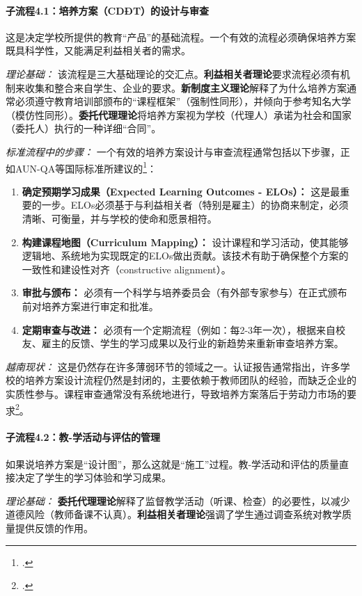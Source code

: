 \paragraph{子流程4.1：培养方案（CDĐT）的设计与审查}
这是决定学校所提供的教育“产品”的基础流程。一个有效的流程必须确保培养方案既具科学性，又能满足利益相关者的需求。

\textit{理论基础：} 该流程是三大基础理论的交汇点。\textbf{利益相关者理论}要求流程必须有机制来收集和整合来自学生、企业的要求。\textbf{新制度主义理论}解释了为什么培养方案通常必须遵守教育培训部颁布的“课程框架”（强制性同形），并倾向于参考知名大学（模仿性同形）。\textbf{委托代理理论}将培养方案视为学校（代理人）承诺为社会和国家（委托人）执行的一种详细“合同”。

\textit{标准流程中的步骤：} 一个有效的培养方案设计与审查流程通常包括以下步骤，正如AUN-QA等国际标准所建议的\footcite{AUN-QAGuide}：
\begin{enumerate}
    \item \textbf{确定预期学习成果（Expected Learning Outcomes - ELOs）：} 这是最重要的一步。ELOs必须基于与利益相关者（特别是雇主）的协商来制定，必须清晰、可衡量，并与学校的使命和愿景相符。
    \item \textbf{构建课程地图（Curriculum Mapping）：} 设计课程和学习活动，使其能够逻辑地、系统地为实现既定的ELOs做出贡献。该技术有助于确保整个方案的一致性和建设性对齐（constructive alignment）。
    \item \textbf{审批与颁布：} 必须有一个科学与培养委员会（有外部专家参与）在正式颁布前对培养方案进行审定和批准。
    \item \textbf{定期审查与改进：} 必须有一个定期流程（例如：每2-3年一次），根据来自校友、雇主的反馈、学生的学习成果以及行业的新趋势来重新审查培养方案。
\end{enumerate}

\textit{越南现状：} 这是仍然存在许多薄弱环节的领域之一。认证报告通常指出，许多学校的培养方案设计流程仍然是封闭的，主要依赖于教师团队的经验，而缺乏企业的实质性参与。课程审查通常没有系统地进行，导致培养方案落后于劳动力市场的要求\footcite{CommonFailureCriteria}。

\paragraph{子流程4.2：教-学活动与评估的管理}
如果说培养方案是“设计图”，那么这就是“施工”过程。教-学活动和评估的质量直接决定了学生的学习体验和学习成果。

\textit{理论基础：} \textbf{委托代理理论}解释了监督教学活动（听课、检查）的必要性，以减少道德风险（教师备课不认真）。\textbf{利益相关者理论}强调了学生通过调查系统对教学质量提供反馈的作用。

